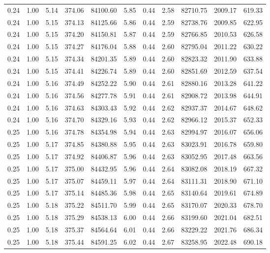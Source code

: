 \begin{table}[!ht]
\begin{tabular}{rrrrrrrrrrr}
0.24 & 1.00 & 5.14 & 374.06 & 84100.60 & 5.85 & 0.44 & 2.58 & 82710.75 & 2009.17 & 619.33 \\
0.24 & 1.00 & 5.15 & 374.13 & 84125.66 & 5.86 & 0.44 & 2.59 & 82738.76 & 2009.85 & 622.95 \\
0.24 & 1.00 & 5.15 & 374.20 & 84150.81 & 5.87 & 0.44 & 2.59 & 82766.85 & 2010.53 & 626.58 \\
0.24 & 1.00 & 5.15 & 374.27 & 84176.04 & 5.88 & 0.44 & 2.60 & 82795.04 & 2011.22 & 630.22 \\
0.24 & 1.00 & 5.15 & 374.34 & 84201.35 & 5.89 & 0.44 & 2.60 & 82823.32 & 2011.90 & 633.88 \\
0.24 & 1.00 & 5.15 & 374.41 & 84226.74 & 5.89 & 0.44 & 2.60 & 82851.69 & 2012.59 & 637.54 \\
0.24 & 1.00 & 5.16 & 374.49 & 84252.22 & 5.90 & 0.44 & 2.61 & 82880.16 & 2013.28 & 641.22 \\
0.24 & 1.00 & 5.16 & 374.56 & 84277.78 & 5.91 & 0.44 & 2.61 & 82908.72 & 2013.98 & 644.91 \\
0.24 & 1.00 & 5.16 & 374.63 & 84303.43 & 5.92 & 0.44 & 2.62 & 82937.37 & 2014.67 & 648.62 \\
0.24 & 1.00 & 5.16 & 374.70 & 84329.16 & 5.93 & 0.44 & 2.62 & 82966.12 & 2015.37 & 652.33 \\
0.25 & 1.00 & 5.16 & 374.78 & 84354.98 & 5.94 & 0.44 & 2.63 & 82994.97 & 2016.07 & 656.06 \\
0.25 & 1.00 & 5.17 & 374.85 & 84380.88 & 5.95 & 0.44 & 2.63 & 83023.91 & 2016.78 & 659.80 \\
0.25 & 1.00 & 5.17 & 374.92 & 84406.87 & 5.96 & 0.44 & 2.63 & 83052.95 & 2017.48 & 663.56 \\
0.25 & 1.00 & 5.17 & 375.00 & 84432.95 & 5.96 & 0.44 & 2.64 & 83082.08 & 2018.19 & 667.32 \\
0.25 & 1.00 & 5.17 & 375.07 & 84459.11 & 5.97 & 0.44 & 2.64 & 83111.31 & 2018.90 & 671.10 \\
0.25 & 1.00 & 5.17 & 375.14 & 84485.36 & 5.98 & 0.44 & 2.65 & 83140.64 & 2019.61 & 674.89 \\
0.25 & 1.00 & 5.18 & 375.22 & 84511.70 & 5.99 & 0.44 & 2.65 & 83170.07 & 2020.33 & 678.70 \\
0.25 & 1.00 & 5.18 & 375.29 & 84538.13 & 6.00 & 0.44 & 2.66 & 83199.60 & 2021.04 & 682.51 \\
0.25 & 1.00 & 5.18 & 375.37 & 84564.64 & 6.01 & 0.44 & 2.66 & 83229.22 & 2021.76 & 686.34 \\
0.25 & 1.00 & 5.18 & 375.44 & 84591.25 & 6.02 & 0.44 & 2.67 & 83258.95 & 2022.48 & 690.18 \\

\end{tabular}
\end{table}
